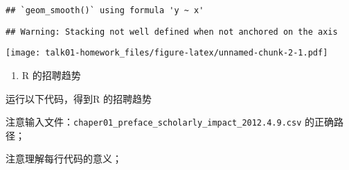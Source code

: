 \documentclass[
]{ctexart}
\providecommand{\tightlist}{%
  \setlength{\itemsep}{0pt}\setlength{\parskip}{0pt}}
\begin{document}
\begin{verbatim}
## `geom_smooth()` using formula 'y ~ x'
\end{verbatim}

\begin{verbatim}
## Warning: Stacking not well defined when not anchored on the axis
\end{verbatim}

\texttt{[image: talk01-homework\_files/figure-latex/unnamed-chunk-2-1.pdf]}

\begin{enumerate}
\def\labelenumi{\arabic{enumi}.}
\setcounter{enumi}{2}
\tightlist
\item
  R 的招聘趋势
\end{enumerate}

运行以下代码，得到R 的招聘趋势

注意输入文件：\texttt{chaper01\_preface\_scholarly\_impact\_2012.4.9.csv}
的正确路径；

注意理解每行代码的意义；
\end{document}
